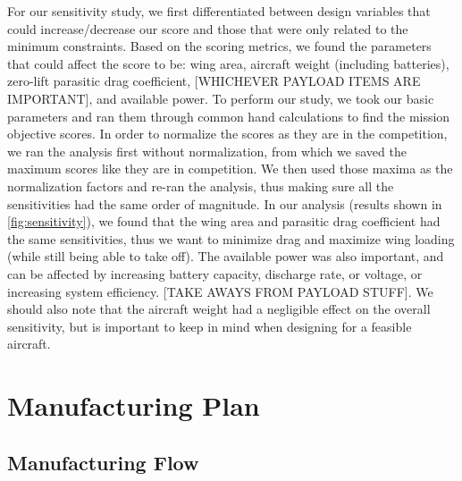 \documentclass[proposal]{byu-aero}
\begin{document}
For our sensitivity study, we first differentiated between design variables that could increase/decrease our score and those that were only related to the minimum constraints. Based on the scoring metrics, we found the parameters that could affect the score to be: wing area, aircraft weight (including batteries), zero-lift parasitic drag coefficient, {\color{BYUred}[WHICHEVER PAYLOAD ITEMS ARE IMPORTANT]}, and available power.  To perform our study, we took our basic parameters and ran them through common hand calculations to find the mission objective scores. In order to normalize the scores as they are in the competition, we ran the analysis first without normalization, from which we saved the maximum scores like they are in competition. We then used those maxima as the normalization factors and re-ran the analysis, thus making sure all the sensitivities had the same order of magnitude.  In our analysis (results shown in \cref{fig:sensitivity}), we found that the wing area and parasitic drag coefficient had the same sensitivities, thus we want to minimize drag and maximize wing loading (while still being able to take off).  The available power was also important, and can be affected by increasing battery capacity, discharge rate, or voltage, or increasing system efficiency. {\color{BYUred}[TAKE AWAYS FROM PAYLOAD STUFF]}. We should also note that the aircraft weight had a negligible effect on the overall sensitivity, but is important to keep in mind when designing for a feasible aircraft.






 \section{Manufacturing Plan} %
\label{sec:ManufacturingPlan}


\subsection{Manufacturing Flow}
\label{ssec:ManufacturingFlow}
\end{document}
